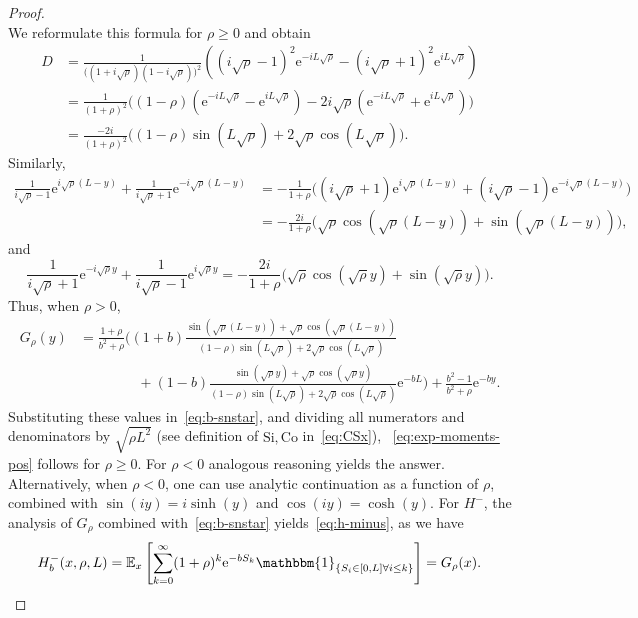 \documentclass[a4paper, a4wide, 10pt, reqno]{amsart}
\theoremstyle{plain}
\theoremstyle{definition}
\numberwithin{equation}{section}
\newcommand{\E}{\mathbb E}
\newcommand{\re}{{\mathrm e}}
\newcommand{\Co}{{\mathrm{Co}}}
\newcommand{\Si}{{\mathrm{Si}}}
\newcommand{\ind}[1]{\mathbbm{1}_{\{#1\}}}
\begin{document}
\begin{proof}
\begin{equation}
\end{equation}
We reformulate this formula  for $\rho\ge0$ and obtain 
\[
\begin{aligned}
D&= \frac{1}{\big((1+i\sqrt{\rho})(1-i\sqrt{\rho})\big)^2}\left((i\sqrt{\rho}-1)^2\re^{-i L\sqrt{\rho}}-(i\sqrt{\rho}+1)^2\re^{i L\sqrt{\rho}}\right)\\ &= \frac{1}{(1+\rho)^2}\Big((1-\rho)(\re^{-i L\sqrt{\rho}}-\re^{i L\sqrt{\rho}})-2i\sqrt{\rho}(\re^{-i L\sqrt{\rho}}+\re^{i L\sqrt{\rho}})\Big)\\ &= \frac{-2i}{(1+\rho)^2}\Big((1-\rho)\sin( L\sqrt{\rho}) + 2\sqrt{\rho}\cos( L\sqrt{\rho})\Big).
\end{aligned}
\]
Similarly, 
\[
\begin{aligned}
\frac1{i\sqrt{\rho}-1}\re^{i\sqrt{\rho}( L-y)} + \frac1{i\sqrt{\rho}+1}\re^{-i\sqrt{\rho}( L-y)} &= -\frac{1}{1+\rho}\Big((i\sqrt{\rho}+1)\re^{i\sqrt{\rho}( L-y)} + (i\sqrt{\rho}-1)\re^{-i\sqrt{\rho}( L-y)}\Big) \\
&= -\frac{2i}{1+\rho}\Big(\sqrt{\rho}\cos(\sqrt{\rho}( L-y)) + \sin(\sqrt{\rho}( L-y))\Big),
\end{aligned}
\]
and 
\[
\frac1{i\sqrt{\rho}+1}\re^{-i\sqrt{\rho}y} + \frac1{i\sqrt{\rho}-1}\re^{i\sqrt{\rho}y} = -\frac{2i}{1+\rho}\Big(\sqrt{\rho}\cos(\sqrt{\rho}y) + \sin(\sqrt{\rho}y)\Big).
\]
Thus, when $\rho>0$, 
\begin{equation}
\begin{aligned}
G_\rho(y) &= \frac{1+\rho}{ b^2 +\rho}\bigg((1+ b)\frac{\sin(\sqrt{\rho}( L-y)) + \sqrt{\rho}\cos(\sqrt{\rho}( L-y))}{(1-\rho)\sin( L\sqrt{\rho}) + 2\sqrt{\rho}\cos( L\sqrt{\rho})} \\
&\hspace{50pt}+ (1- b)\frac{\sin(\sqrt{\rho}y) + \sqrt{\rho}\cos(\sqrt{\rho}y)}{(1-\rho)\sin( L\sqrt{\rho}) + 2\sqrt{\rho}\cos( L\sqrt{\rho})}\re^{- b L}\bigg) + \frac{ b^2-1}{ b^2+\rho}\re^{- by}.\label{eq:fredholm-sol-pos}
\end{aligned}
\end{equation}
Substituting these values in~\eqref{eq:b-snstar}, and dividing all numerators and denominators by $\sqrt{\rho L^2}$ (see definition of $\Si, \Co$ in~\eqref{eq:CSx}), 
~\eqref{eq:exp-moments-pos} follows for $\rho\ge0$. For $\rho< 0$ analogous reasoning yields the answer. 
Alternatively, when $\rho< 0$, one can use analytic continuation as a function of $\rho$, combined with $\sin(iy) =i\sinh(y)$ and $\cos(iy)=\cosh(y)$.
For $H^-$, the  analysis of $G_\rho$ combined with~\eqref{eq:b-snstar} yields~\eqref{eq:h-minus}, as we have 
\[
H^-_{b}(x,\rho, L) = \E_{x}\left[\sum_{k=0}^\infty(1+\rho)^k\re^{-bS_k}\ind{S_i\in[0,L]\forall i\le k}\right]=G_\rho(x).\qedhere
\]
    \end{proof}
    
\end{document}
